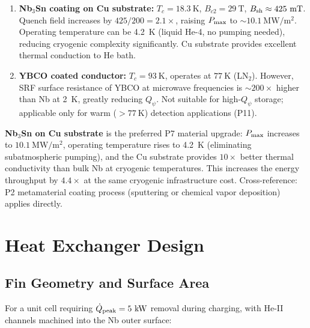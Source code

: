 \documentclass[aps,prd,twocolumn,superscriptaddress]{revtex4-2}
\newcommand{\Pmax}{P_{\rm max}}
\begin{document}
\begin{enumerate}
\item \textbf{Nb$_3$Sn coating on Cu substrate:}
  $T_c = 18.3~\mathrm{K}$, $B_{c2} = 29~\mathrm{T}$,
  $B_{\rm sh} \approx 425~\mathrm{mT}$.
  Quench field increases by $425/200 = 2.1\times$,
  raising $\Pmax$ to $\sim 10.1~\mathrm{MW/m^2}$.
  Operating temperature can be 4.2~K (liquid He-4, no pumping needed),
  reducing cryogenic complexity significantly.
  Cu substrate provides excellent thermal conduction to He bath.

\item \textbf{YBCO coated conductor:}
  $T_c = 93~\mathrm{K}$, operates at $77~\mathrm{K}$ (LN$_2$).
  However, SRF surface resistance of YBCO at microwave frequencies
  is $\sim 200\times$ higher than Nb at 2~K, greatly reducing $Q_\psi$.
  Not suitable for high-$Q_\psi$ storage; applicable only for warm
  ($>77~\mathrm{K}$) detection applications (P11).
\end{enumerate}

\begin{tcolorbox}[title=P2 Material Recommendation for P7]
\textbf{Nb$_3$Sn on Cu substrate} is the preferred P7 material upgrade:
$\Pmax$ increases to $10.1~\mathrm{MW/m^2}$, operating temperature
rises to 4.2~K (eliminating subatmospheric pumping), and the Cu substrate
provides $10\times$ better thermal conductivity than bulk Nb at cryogenic
temperatures.  This increases the energy throughput by $4.4\times$ at the
same cryogenic infrastructure cost.  Cross-reference: P2 metamaterial
coating process (sputtering or chemical vapor deposition) applies directly.
\end{tcolorbox}

\section{Heat Exchanger Design}
\label{sec:heatex}

\subsection{Fin Geometry and Surface Area}

For a unit cell requiring $\dot{Q}_{\rm peak} = 5~\mathrm{kW}$ removal
during charging, with He-II channels machined into the Nb outer surface:
\end{document}
